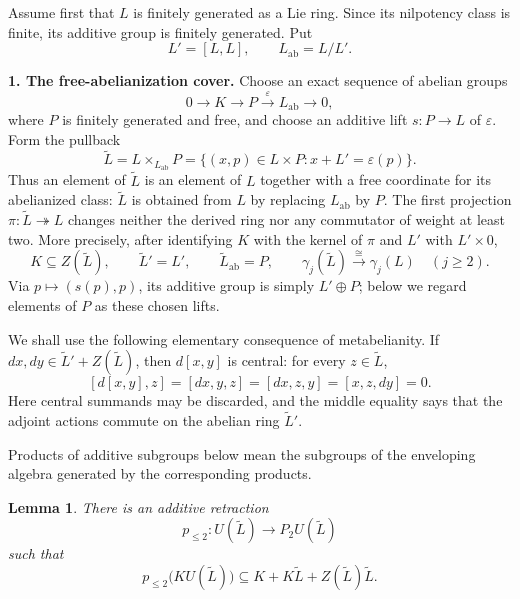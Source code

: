 \documentclass[a4paper,11pt,reqno]{amsart}
\newtheorem{lemma}[theorem]{Lemma}
\begin{document}
Assume first that $L$ is finitely generated as a Lie ring.  Since its
nilpotency class is finite, its additive group is finitely generated.
Put
\[
                         L'=[L,L],
             \qquad L_{\mathrm{ab}}=L/L'.
\]

\medskip\noindent\textbf{1. The free-abelianization cover.}
Choose an exact sequence of abelian groups
\[
 0\longrightarrow K\longrightarrow P
 \overset{\varepsilon}{\longrightarrow}L_{\mathrm{ab}}
 \longrightarrow0,
\]
where $P$ is finitely generated and free, and choose an additive lift
$s:P\to L$ of $\varepsilon$.  Form the pullback
\[
 \widetilde L=L\times_{L_{\mathrm{ab}}}P
 =\{(x,p)\in L\times P:x+L'=\varepsilon(p)\}.
\]
Thus an element of $\widetilde L$ is an element of $L$ together with a
free coordinate for its abelianized class: $\widetilde L$ is obtained
from $L$ by replacing $L_{\mathrm{ab}}$ by $P$.  The first projection
$\pi:\widetilde L\twoheadrightarrow L$ changes neither the derived
ring nor any commutator of weight at least two.  More precisely, after
identifying $K$ with the kernel of $\pi$ and $L'$ with $L'\times0$,
\[
 K\subseteq Z(\widetilde L),\qquad
 \widetilde L'=L',\qquad
 \widetilde L_{\mathrm{ab}}=P,\qquad
 \gamma_j(\widetilde L)\xrightarrow{\ \cong\ }\gamma_j(L)
 \quad(j\geq2).
\]
Via $p\mapsto(s(p),p)$, its additive group is simply $L'\oplus P$;
below we regard elements of $P$ as these chosen lifts.

We shall use the following elementary consequence of metabelianity.
If $d x,d y\in\widetilde L'+Z(\widetilde L)$, then $d[x,y]$ is
central: for every $z\in\widetilde L$,
\[
 [d[x,y],z]=[d x,y,z]=[d x,z,y]=[x,z,d y]=0.
\]
Here central summands may be discarded, and the middle equality says
that the adjoint actions commute on the abelian ring $\widetilde L'$.

Products of additive subgroups below mean the subgroups of the
enveloping algebra generated by the corresponding products.

\begin{lemma}\label{lem:adapted-pbw}
There is an additive retraction
\[
 p_{\leq2}:U(\widetilde L)\longrightarrow P_2U(\widetilde L)
\]
such that
\[
 p_{\leq2}\bigl(KU(\widetilde L)\bigr)
 \subseteq K+K\widetilde L+Z(\widetilde L)\widetilde L.
\]
\end{lemma}
\end{document}
